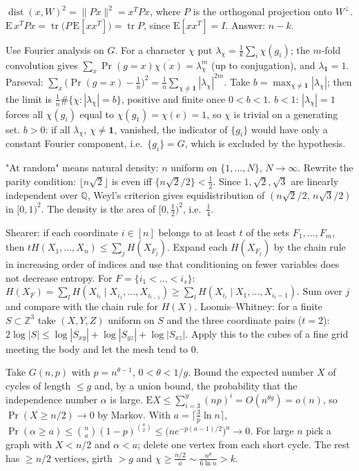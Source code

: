 \documentclass[11pt,a4paper]{article}
\begin{document}

 $\operatorname{dist}(x,W)^2=\|Px\|^2=x^TPx$, where $P$ is the orthogonal projection onto $W^\perp$.
 $\mathrm E\,x^TPx=\operatorname{tr}\big(P\,\mathrm E[xx^T]\big)=\operatorname{tr}P$, since $\mathrm E[xx^T]=I$. Answer: $n-k$.

 Use Fourier analysis on $G$. For a character $\chi$ put $\lambda_\chi=\frac1k\sum_i\chi(g_i)$; the $m$-fold convolution gives $\sum_x\Pr(g=x)\overline{\chi(x)}=\lambda_\chi^m$ (up to conjugation), and $\lambda_{\mathbf 1}=1$.
 Parseval: $\sum_x\big(\Pr(g=x)-\frac1n\big)^2=\frac1n\sum_{\chi\ne\mathbf 1}|\lambda_\chi|^{2m}$. Take $b=\max_{\chi\ne\mathbf 1}|\lambda_\chi|$; then the limit is $\frac1n\#\{\chi:|\lambda_\chi|=b\}$, positive and finite once $0<b<1$.
 $b<1$: $|\lambda_\chi|=1$ forces all $\chi(g_i)$ equal to $\chi(g_1)=\chi(e)=1$, so $\chi$ is trivial on a generating set. $b>0$: if all $\lambda_\chi$, $\chi\ne\mathbf 1$, vanished, the indicator of $\{g_i\}$ would have only a constant Fourier component, i.e.\ $\{g_i\}=G$, which is excluded by the hypothesis.

 "At random" means natural density: $n$ uniform on $\{1,\dots,N\}$, $N\to\infty$. Rewrite the parity condition: $\lfloor n\sqrt2\rfloor$ is even iff $\{n\sqrt2/2\}<\frac12$.
 Since $1,\sqrt2,\sqrt3$ are linearly independent over $\mathbb Q$, Weyl's criterion gives equidistribution of $(n\sqrt2/2,\,n\sqrt3/2)$ in $[0,1)^2$. The density is the area of $[0,\frac12)^2$, i.e.\ $\frac14$.

 Shearer: if each coordinate $i\in[n]$ belongs to at least $t$ of the sets $F_1,\dots,F_m$, then $tH(X_1,\dots,X_n)\le\sum_jH(X_{F_j})$. Expand each $H(X_{F_j})$ by the chain rule in increasing order of indices and use that conditioning on fewer variables does not decrease entropy.
 For $F=\{i_1<\dots<i_s\}$: $H(X_F)=\sum_lH(X_{i_l}\mid X_{i_1},\dots,X_{i_{l-1}})\ge\sum_lH(X_{i_l}\mid X_1,\dots,X_{i_l-1})$. Sum over $j$ and compare with the chain rule for $H(X)$.
 Loomis--Whitney: for a finite $S\subset\mathbb Z^3$ take $(X,Y,Z)$ uniform on $S$ and the three coordinate pairs ($t=2$): $2\log|S|\le\log|S_{xy}|+\log|S_{yz}|+\log|S_{xz}|$. Apply this to the cubes of a fine grid meeting the body and let the mesh tend to $0$.

 Take $G(n,p)$ with $p=n^{\theta-1}$, $0<\theta<1/g$. Bound the expected number $X$ of cycles of length $\le g$ and, by a union bound, the probability that the independence number $\alpha$ is large.
 $\mathrm EX\le\sum_{i=3}^g(np)^i=O(n^{\theta g})=o(n)$, so $\Pr(X\ge n/2)\to0$ by Markov. With $a=\lceil\frac3p\ln n\rceil$, $\Pr(\alpha\ge a)\le\binom na(1-p)^{\binom a2}\le\big(ne^{-p(a-1)/2}\big)^a\to0$.
 For large $n$ pick a graph with $X<n/2$ and $\alpha<a$; delete one vertex from each short cycle. The rest has $\ge n/2$ vertices, girth $>g$ and $\chi\ge\frac{n/2}{a}\sim\frac{n^\theta}{6\ln n}>k$.
\end{document}
